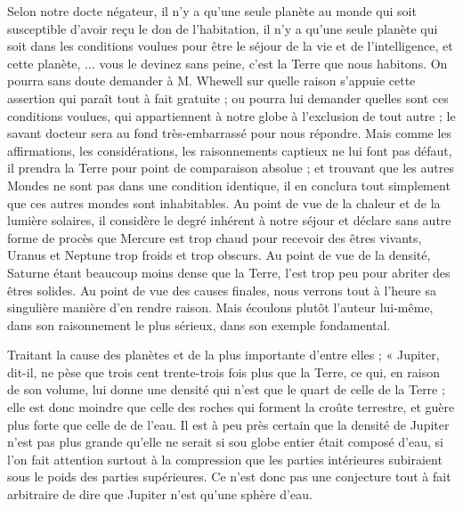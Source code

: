 \documentclass[a4paper, 11pt, oneside]{article}
\begin{document}
Selon notre docte négateur, il n'y a qu'une seule planète au monde qui soit susceptible d'avoir reçu le don de l'habitation, il n'y a qu'une seule planète qui soit dans les conditions voulues pour être le séjour de la vie et de l'intelligence, et cette planète, ... vous le devinez sans peine, c'est la Terre que nous habitons. On pourra sans doute demander à M. Whewell sur quelle raison s'appuie cette assertion qui paraît tout à fait gratuite ; ou pourra lui demander quelles sont ces conditions voulues, qui appartiennent à notre globe à l'exclusion de tout autre ; le savant docteur sera au fond très-embarrassé pour nous répondre. Mais comme les affirmations, les considérations, les raisonnements captieux ne lui font pas défaut, il prendra la Terre pour point de comparaison absolue ; et trouvant que les autres Mondes ne sont pas dans une condition identique, il en conclura tout simplement que ces autres mondes sont inhabitables. Au point de vue de la chaleur et de la lumière solaires, il considère le degré inhérent à notre séjour et déclare sans autre forme de procès que Mercure est trop chaud pour recevoir des êtres vivants, Uranus et Neptune trop froids et trop obscurs. Au point de vue de la densité, Saturne étant beaucoup moins dense que la Terre, l'est trop peu pour abriter des êtres solides. Au point de vue des causes finales, nous verrons tout à l'heure sa singulière manière d'en rendre raison. Mais écoulons plutôt l'auteur lui-même, dans son raisonnement le plus sérieux, dans son exemple fondamental.

Traitant la cause des planètes et de la plus importante d'entre elles ; « Jupiter, dit-il, ne pèse que trois cent trente-trois fois plus que la Terre, ce qui, en raison de son volume, lui donne une densité qui n'est que le quart de celle de la Terre ; elle est donc moindre que celle des roches qui forment la croûte terrestre, et guère plus forte que celle de de l'eau. Il est à peu près certain que la densité de Jupiter n'est pas plus grande qu'elle ne serait si sou globe entier était composé d'eau, si l'on fait attention surtout à la compression que les parties intérieures subiraient sous le poids des parties supérieures. Ce n'est donc pas une conjecture tout à fait arbitraire de dire que Jupiter n'est qu'une sphère d'eau.
\end{document}
